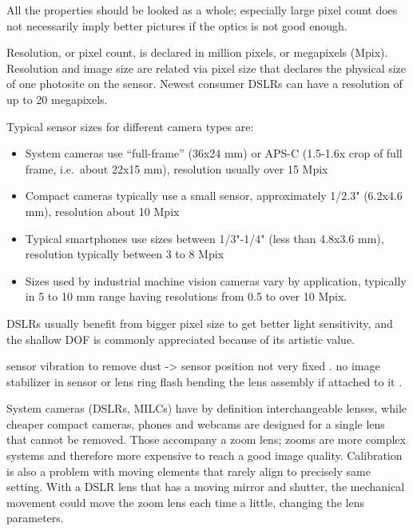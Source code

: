 All the properties should be looked as a whole; especially large pixel count does not necessarily imply better pictures if the optics is not good enough.

Resolution, or pixel count, is declared in million pixels, or megapixels (Mpix).
Resolution and image size are related via pixel size that declares the physical size of one photosite on the sensor.
Newest consumer DSLRs can have a resolution of up to 20 megapixels.




Typical sensor sizes for different camera types are:

\begin{itemize}
	\item System cameras use ``full-frame'' (36x24 mm) or APS-C (1.5-1.6x crop of full frame, i.e.~about 22x15 mm), resolution usually over 15 Mpix
	\item Compact cameras typically use a small sensor, approximately 1/2.3" (6.2x4.6 mm), resolution about 10 Mpix
	\item Typical smartphones use sizes between 1/3"-1/4" (less than 4.8x3.6 mm), resolution typically between 3 to 8 Mpix
	\item Sizes used by industrial machine vision cameras vary by application, typically in 5 to 10 mm range having resolutions from 0.5 to over 10 Mpix.
\end{itemize}

DSLRs usually benefit from bigger pixel size to get better light sensitivity, and the shallow DOF is commonly appreciated because of its artistic value.

sensor vibration to remove dust -> sensor position not very fixed \cite{rieke2009}. %
no image stabilizer in sensor or lens \cite{photogrammetry.doc}
ring flash bending the lens assembly if attached to it \cite{rieke2009}.


System cameras (DSLRs, MILCs) have by definition interchangeable lenses, while cheaper compact cameras, phones and webcams are designed for a single lens that cannot be removed.
Those accompany a zoom lens; zooms are more complex systems and therefore more expensive to reach a good image quality.
Calibration is also a problem with moving elements that rarely align to precisely same setting.
With a DSLR lens that has a moving mirror and shutter, the mechanical movement could move the zoom lens each time a little, changing the lens parameters.

